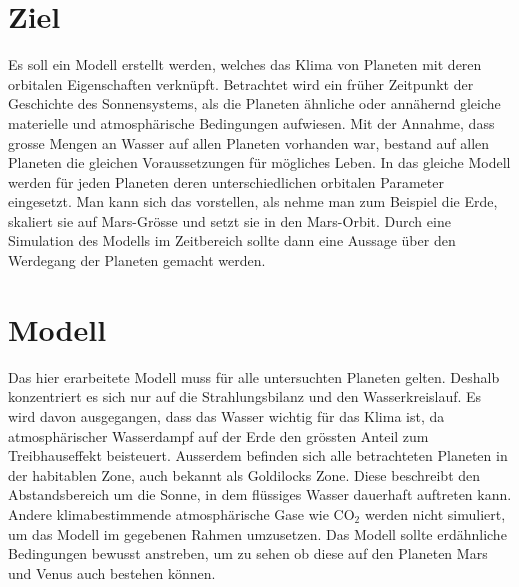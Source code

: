 \begin{refsection}

\section{Ziel}
Es soll ein Modell erstellt werden, welches das Klima von Planeten mit deren orbitalen Eigenschaften verknüpft.
Betrachtet wird ein früher Zeitpunkt der Geschichte des Sonnensystems, als die Planeten ähnliche oder annähernd gleiche materielle und atmosphärische Bedingungen aufwiesen.
Mit der Annahme, dass grosse Mengen an Wasser auf allen Planeten vorhanden war, bestand auf allen Planeten die gleichen Voraussetzungen für mögliches Leben.
In das gleiche Modell werden für jeden Planeten deren unterschiedlichen orbitalen Parameter eingesetzt. Man kann sich das vorstellen, als nehme man zum Beispiel die Erde, skaliert sie auf Mars-Grösse und setzt sie in den Mars-Orbit. 
Durch eine Simulation des Modells im Zeitbereich sollte dann eine Aussage über den Werdegang der Planeten gemacht werden.

\section{Modell}


	

	
	
	
	Das hier erarbeitete Modell muss für alle untersuchten Planeten gelten. Deshalb konzentriert es sich nur auf die Strahlungsbilanz und den Wasserkreislauf. Es wird davon ausgegangen, dass das Wasser wichtig für das Klima ist, da atmosphärischer Wasserdampf auf der Erde den grössten Anteil zum Treibhauseffekt beisteuert. Ausserdem befinden sich alle betrachteten Planeten in der habitablen Zone, auch bekannt als Goldilocks Zone. Diese beschreibt den Abstandsbereich um die Sonne, in dem flüssiges Wasser dauerhaft auftreten kann.
	Andere klimabestimmende atmosphärische Gase wie $\text{CO}_\text{2}$ werden nicht simuliert, um das Modell im gegebenen Rahmen umzusetzen.
	Das Modell sollte erdähnliche Bedingungen bewusst anstreben, um zu sehen ob diese auf den Planeten Mars und Venus auch bestehen können.
	

\end{refsection}

